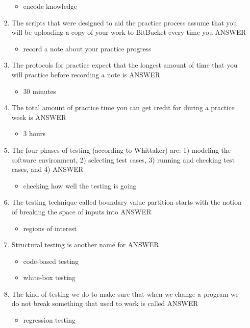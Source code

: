 \documentclass{exam}
\begin{document}
\begin{enumerate}
\begin{itemize}
\item encode knowledge
\end{itemize}
\item The scripts that were designed to aid the practice process assume that you will be uploading a copy of your work to BitBucket every time you ANSWER
\begin{itemize}
\item record a note about your practice progress
\end{itemize}
\item The protocols for practice expect that the longest amount of time that you will practice before recording a note is ANSWER
\begin{itemize}
\item 30 minutes
\end{itemize}
\item The total amount of practice time you can get credit for during a practice week is ANSWER
\begin{itemize}
\item 3 hours
\end{itemize}
\item The four phases of testing (according to Whittaker) are: 1) modeling the software environment, 2) selecting test cases, 3) running and checking test cases, and 4) ANSWER
\begin{itemize}
\item checking how well the testing is going
\end{itemize}
\item The testing technique called boundary value partition starts with the notion of breaking the space of inputs into ANSWER
\begin{itemize}
\item regions of interest
\end{itemize}
\item Structural testing is another name for ANSWER
\begin{itemize}
\item code-based testing
\item white-box testing
\end{itemize}
\item The kind of testing we do to make sure that when we change a program we do not break something that used to work is called ANSWER
\begin{itemize}
\item regression testing
\end{itemize}

\end{enumerate}
\end{document}
